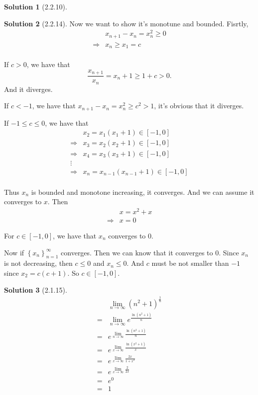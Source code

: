 \documentclass{article}
\theoremstyle{definition}
\newtheorem{sol}{Solution}[exe]
\begin{document}
\begin{sol}[2.2.10]
    
\end{sol}

\begin{sol}[2.2.14]

    Now we want to show it's monotune and bounded. Fisrtly, 
    \begin{align*}
        &x_{n+1}-x_{n}=x_{n}^{2}\geq 0\\
        \Rightarrow &x_{n} \geq x_{1}=c\\
    \end{align*} 

    If $c>0$, we have that $$\frac{x_{n+1}}{x_{n}}=x_{n}+1\geq 1+c >0.$$
    And it diverges.

    If $c<-1$, we have that $x_{n+1}-x_{n}=x_{n}^{2}\geq c^{2}>1$, it's obvious that it diverges.
    
    If $-1\leq c\leq 0$, we have that 
    \begin{align*}
    &x_{2}=x_{1}(x_{1}+1)\in[-1,0]\\
    \Rightarrow &x_{3}=x_{2}(x_{2}+1)\in[-1,0]\\
    \Rightarrow &x_{4}=x_{3}(x_{3}+1)\in[-1,0]\\
    \vdots\\
    \Rightarrow &x_{n}=x_{n-1}(x_{n-1}+1)\in[-1,0]\\
    \end{align*}

    Thus $x_{n}$ is bounded and monotone increasing, it converges. And we can assume it converges to $x$. Then
\begin{align*}
    &x=x^{2}+x\\
    \Rightarrow & x=0
\end{align*}
    
    For $c\in[-1,0]$, we have that $x_{n}$ converges to $0$.

Now if $\left\{x_{n}\right\}_{n=1}^{\infty}$ converges. Then we can know that it converges to $0$. Since $x_{n}$ is not decreasing, then $c\leq 0$ and $x_{n}\leq0$.
And $c$ must be not smaller than $-1$ since $x_{2}=c(c+1)$. So $c\in[-1,0]$.
\end{sol}

\begin{sol}[2.1.15]
    \begin{align*}
        & \lim_{n\to\infty}(n^2+1)^{\frac{1}{n}}\\
        =& \lim_{n\to\infty}e^{\frac{\ln(n^2+1)}{n}}\\
        =& e^{\lim_{n\to\infty}\frac{\ln(n^2+1)}{n}}\\
        =& e^{\lim_{x\to\infty}\frac{\ln(x^2+1)}{x}}\\
        =& e^{\lim_{x\to\infty}\frac{2x}{1+x^2}}\\
        =& e^{\lim_{x\to\infty}\frac{2}{2x}}\\
        =& e^{0}\\
        =& 1
    \end{align*}
\end{sol}
\end{document}

